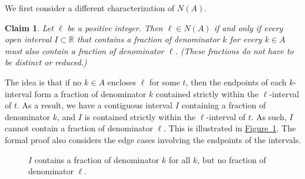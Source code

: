 \documentclass[11pt]{article}
\numberwithin{equation}{section}
\newtheorem{claim}[theorem]{Claim}
\theoremstyle{definition}
\theoremstyle{plain}
\newcommand{\expref}[2]{\hyperref[#2]{#1~\ref{#2}}}
\newcommand{\Nbr}{N}
\newcommand{\A}{A}
\begin{document}
We first consider a different characterization of $\Nbr(\A)$.

\begin{claim}
    \label{claim:intervalcondition}
    Let $\ell$ be a positive integer. Then $\ell\in \Nbr(\A)$ if and only if every open interval $I\subset \mathbb{R}$ that contains a fraction of denominator $k$ for every $k\in \A$ must also contain a fraction of denominator $\ell$. (These fractions do not have to be distinct or reduced.)
\end{claim}

The idea is that if no $k\in \A$ encloses $\ell$ for some $t$, then the endpoints of each $k$-interval form a fraction of denominator $k$ contained strictly within the $\ell$-interval of $t$. As a result, we have a contiguous interval $I$ containing a fraction of denominator $k$, and $I$ is contained strictly within the $\ell$-interval of $t$. As such, $I$ cannot contain a fraction of denominator $\ell$. This is illustrated in \expref{Figure}{fig:intervalcondition}. The formal proof also considers the edge cases involving the endpoints of the intervals.

\begin{figure}[ht]
    \centering
    \caption{$I$ contains a fraction of denominator $k$ for all $k$, but no fraction of denominator $\ell$.}
    \label{fig:intervalcondition}
\end{figure}
\end{document}
